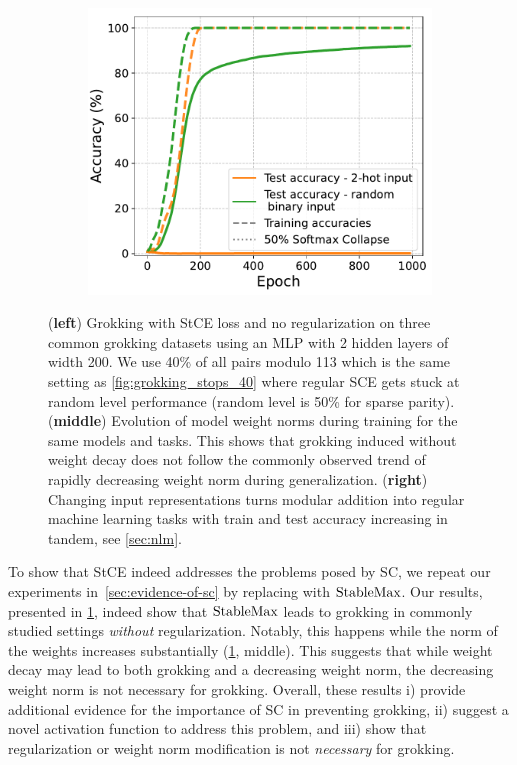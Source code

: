 \begin{figure}[t]
\hfill
\begin{subfigure}[t]{.32\textwidth}
    \includegraphics[width=\linewidth]{grokking_iclr_arxiv/figures/input_representations.pdf}
\end{subfigure}%
\vspace{-5mm}
    \caption{(\textbf{left}) Grokking with StCE loss and no regularization on three common grokking datasets using an MLP with 2 hidden layers of width 200. We use  40\% of all pairs modulo 113 which is the same setting as \cref{fig:grokking_stops_40} where regular SCE gets stuck at random level performance (random level is 50\% for sparse parity). (\textbf{middle}) Evolution of model weight norms during training for the same models and tasks. This shows that grokking induced without weight decay does not follow the commonly observed trend of rapidly decreasing weight norm during generalization. (\textbf{right}) Changing input representations turns modular addition into regular machine learning tasks with train and test accuracy increasing in tandem, see \cref{sec:nlm}.\vspace{-5mm}}
    \label{fig:input_representations}
\end{figure}

To show that StCE indeed addresses the problems posed by SC, we repeat our experiments in~\cref{sec:evidence-of-sc} by replacing \softmax with $\mathrm{StableMax}$. Our results, presented in \cref{fig:input_representations}, indeed show that $\mathrm{StableMax}$ leads to grokking in commonly studied settings \textit{without} regularization. Notably, this happens while the norm of the weights increases substantially (\cref{fig:input_representations}, middle). This suggests that while weight decay may lead to both grokking and a decreasing weight norm, the decreasing weight norm is not necessary for grokking. Overall, these results i) provide additional evidence for the importance of SC in preventing grokking, ii) suggest a novel activation function to address this problem, and iii) show that regularization or weight norm modification is not \textit{necessary} for grokking.

